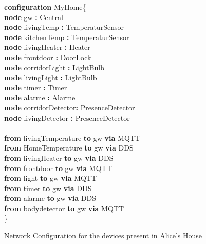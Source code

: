 \begin{figure}[t]%
	\begin{boxedminipage}[t]{\columnwidth}
	\begin{sffamily}
		\begin{tiny}
		{\setlength{\baselineskip}{1.2\baselineskip}
\textbf{configuration} MyHome\{\\
   \phantom{M}\textbf{node} gw \textbf{:} Central\\
   \phantom{M}\textbf{node} livingTemp  \textbf{:} TemperaturSensor\\
   \phantom{M}\textbf{node} kitchenTemp \textbf{:} TemperaturSensor\\
   \phantom{M}\textbf{node} livingHeater  \textbf{:} Heater\\
   \phantom{M}\textbf{node} frontdoor     \textbf{:} DoorLock\\
   \phantom{M}\textbf{node} corridorLight \textbf{:} LightBulb\\
	\phantom{M}\textbf{node} livingLight   \textbf{:} LightBulb\\
   \phantom{M}\textbf{node} timer  \textbf{:} Timer\\
   \phantom{M}\textbf{node} alarme \textbf{:} Alarme\\
   \phantom{M}\textbf{node} corridorDetector\textbf{:} PresenceDetector\\
	\phantom{M}\textbf{node} livingDetector  \textbf{:} PresenceDetector
	\\\\
   \phantom{M}\textbf{from} livingTemperature  \textbf{to} gw \textbf{via} MQTT\\
   \phantom{M}\textbf{from} HomeTemperature \textbf{to} gw \textbf{via} DDS\\
   \phantom{M}\textbf{from} livingHeater   \textbf{to} gw \textbf{via} DDS\\
   \phantom{M}\textbf{from} frontdoor  \textbf{to} gw \textbf{via} MQTT\\
   \phantom{M}\textbf{from} light \textbf{to} gw \textbf{via} MQTT\\
   \phantom{M}\textbf{from} timer \textbf{to} gw \textbf{via} DDS\\
   \phantom{M}\textbf{from} alarme \textbf{to} gw \textbf{via} DDS\\
   \phantom{M}\textbf{from} bodydetector  \textbf{to} gw \textbf{via} MQTT\\
\}
	\par}
		\end{tiny}
	\end{sffamily}
	\end{boxedminipage}
	\caption{Network Configuration for the devices present in Alice's House}%
	\label{fig:RE-Network}%
\end{figure}	

